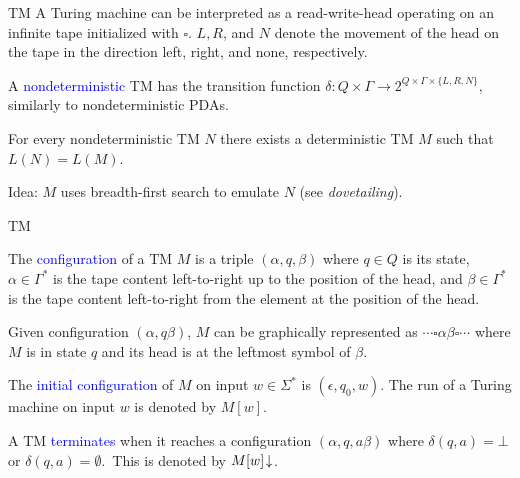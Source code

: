 \documentclass{beamer}
\theoremstyle{definition}
\def\spadding{\vspace{0.25cm}}
\def\b{\textcolor{blue}}
\begin{document}
\begin{frame}{TM}
    A Turing machine can be interpreted as a read-write-head operating on an infinite tape initialized with $\square$. $L, R$, and $N$ denote the movement of the head on the tape in the direction left, right, and none, respectively.\pause\par\spadding
    \begin{definition}
        A \b{nondeterministic} TM has the transition function $\delta : Q \times \Gamma \to 2^{Q \times \Gamma \times \{L,R,N\}}$, similarly to nondeterministic PDAs.
    \end{definition}\pause
    \begin{theorem}
        For every nondeterministic TM $N$ there exists a deterministic TM $M$ such that $L(N) = L(M)$.
    \end{theorem}\pause
    Idea: $M$ uses breadth-first search to emulate $N$ (see \textit{dovetailing}).
\end{frame}

\begin{frame}{TM}
    \begin{definition}
        The \b{configuration} of a TM $M$ is a triple $(\alpha, q, \beta)$ where $q \in Q$ is its state, $\alpha \in \Gamma^*$ is the tape content left-to-right up to the position of the head, and $\beta \in \Gamma^*$ is the tape content left-to-right from the element at the position of the head.\pause\par
        Given configuration $(\alpha,q\beta)$, $M$ can be graphically represented as $\cdots \square \alpha \beta \square \cdots$ where $M$ is in state $q$ and its head is at the leftmost symbol of $\beta$.\pause\par\spadding
        The \b{initial configuration} of $M$ on input $w \in \Sigma^*$ is $(\epsilon,q_0,w)$.\pause
        The run of a Turing machine on input $w$ is denoted by $M[w]$.
    \end{definition}\pause
    \begin{definition}
        A TM \b{terminates} when it reaches a configuration $(\alpha,q,a \beta)$ where $\delta(q,a) = \bot$ or $\delta(q,a) = \emptyset$.\pause\ This is denoted by $M[w]\joinrel\downarrow$.
    \end{definition}
\end{frame}
\end{document}
